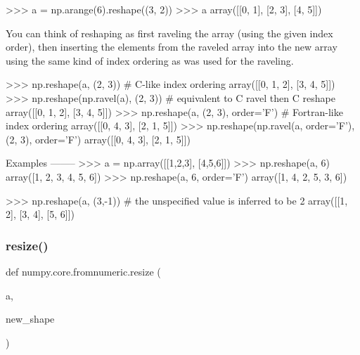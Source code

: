 \begin{DoxyVerb}
>>> a = np.arange(6).reshape((3, 2))
>>> a
array([[0, 1],
       [2, 3],
       [4, 5]])

You can think of reshaping as first raveling the array (using the given
index order), then inserting the elements from the raveled array into the
new array using the same kind of index ordering as was used for the
raveling.

>>> np.reshape(a, (2, 3)) # C-like index ordering
array([[0, 1, 2],
       [3, 4, 5]])
>>> np.reshape(np.ravel(a), (2, 3)) # equivalent to C ravel then C reshape
array([[0, 1, 2],
       [3, 4, 5]])
>>> np.reshape(a, (2, 3), order='F') # Fortran-like index ordering
array([[0, 4, 3],
       [2, 1, 5]])
>>> np.reshape(np.ravel(a, order='F'), (2, 3), order='F')
array([[0, 4, 3],
       [2, 1, 5]])

Examples
--------
>>> a = np.array([[1,2,3], [4,5,6]])
>>> np.reshape(a, 6)
array([1, 2, 3, 4, 5, 6])
>>> np.reshape(a, 6, order='F')
array([1, 4, 2, 5, 3, 6])

>>> np.reshape(a, (3,-1))       # the unspecified value is inferred to be 2
array([[1, 2],
       [3, 4],
       [5, 6]])
\end{DoxyVerb}
 \mbox{\label{namespacenumpy_1_1core_1_1fromnumeric_a305a853e726d7cac4811a5be0b72662a}} 
\subsubsection{\texorpdfstring{resize()}{resize()}}
{\footnotesize\ttfamily def numpy.\+core.\+fromnumeric.\+resize (\begin{DoxyParamCaption}\item[{}]{a,  }\item[{}]{new\+\_\+shape }\end{DoxyParamCaption})}

